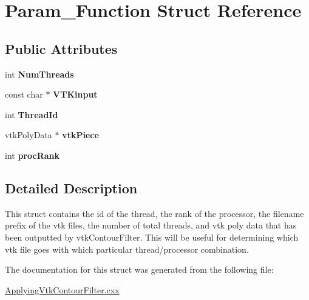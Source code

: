 \hypertarget{structParam__Function}{\section{\-Param\-\_\-\-Function \-Struct \-Reference}
\label{structParam__Function}
}
\subsection*{\-Public \-Attributes}
\begin{DoxyCompactItemize}
\item 
\hypertarget{structParam__Function_a62f5779e61792217638c5e4747df2afe}{int {\bfseries \-Num\-Threads}}\label{structParam__Function_a62f5779e61792217638c5e4747df2afe}

\item 
\hypertarget{structParam__Function_aa784ecef91feb2bd20d83d9278198f70}{const char $\ast$ {\bfseries \-V\-T\-Kinput}}\label{structParam__Function_aa784ecef91feb2bd20d83d9278198f70}

\item 
\hypertarget{structParam__Function_a3db4cf888214b6398c0b1932a686f200}{int {\bfseries \-Thread\-Id}}\label{structParam__Function_a3db4cf888214b6398c0b1932a686f200}

\item 
\hypertarget{structParam__Function_a83337a785b859dc4998582842e9719e5}{vtk\-Poly\-Data $\ast$ {\bfseries vtk\-Piece}}\label{structParam__Function_a83337a785b859dc4998582842e9719e5}

\item 
\hypertarget{structParam__Function_ab985c455542df04bd63fc37744915b34}{int {\bfseries proc\-Rank}}\label{structParam__Function_ab985c455542df04bd63fc37744915b34}

\end{DoxyCompactItemize}


\subsection{\-Detailed \-Description}
\-This struct contains the id of the thread, the rank of the processor, the filename prefix of the vtk files, the number of total threads, and vtk poly data that has been outputted by vtk\-Contour\-Filter. \-This will be useful for determining which vtk file goes with which particular thread/processor combination. 

\-The documentation for this struct was generated from the following file\-:\begin{DoxyCompactItemize}
\item 
\hyperlink{ApplyingVtkContourFilter_8cxx}{\-Applying\-Vtk\-Contour\-Filter.\-cxx}\end{DoxyCompactItemize}
